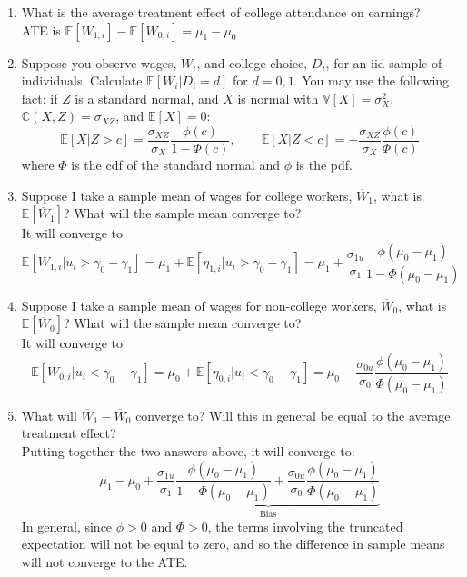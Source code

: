\documentclass[12pt]{article}
\newcommand\ov{\overline}
\newcommand\BB{\mathbb}
\newcommand\EE{\mathbb{E}}
\numberwithin{equation}{section}
\numberwithin{figure}{section}
\numberwithin{table}{section}
\begin{document}
\begin{enumerate}
\item What is the average treatment effect of college attendance on earnings? \\
  {\color{blue}ATE is $\EE[W_{1,i}]-\EE[W_{0,i}] = \mu_1-\mu_0$}
\item Suppose you observe wages, $W_i$, and college choice, $D_i$, for an iid sample of individuals. Calculate $\EE[W_i|D_i=d]$ for $d=0,1$. You may use the following fact: if $Z$ is a standard normal, and $X$ is normal with $\BB{V}[X]=\sigma^2_{X}$, $\BB{C}(X,Z)=\sigma_{XZ}$, and $\EE[X]=0$:
  \[\EE[X|Z>c] = \frac{\sigma_{XZ}}{\sigma_X}\frac{\phi(c)}{1-\Phi(c)},\qquad \EE[X|Z<c] = -\frac{\sigma_{XZ}}{\sigma_X}\frac{\phi(c)}{\Phi(c)} \]
  where $\Phi$ is the cdf of the standard normal and $\phi$ is the pdf.
\item Suppose I take a sample mean of wages for college workers, $\ov{W}_1$, what is $\EE[\ov{W}_1]$? What will the sample mean converge to? \\
  {\color{blue}  It will converge to
    \[\EE[W_{1,i}|u_i>\gamma_0-\gamma_1] = \mu_{1} + \EE[\eta_{1,i}|u_i>\gamma_0-\gamma_1] = \mu_1 + \frac{\sigma_{1u}}{\sigma_1}\frac{\phi(\mu_0-\mu_1)}{1-\Phi(\mu_0-\mu_1)}\]
  }
\item Suppose I take a sample mean of wages for non-college workers, $\ov{W}_0$, what is $\EE[\ov{W}_0]$? What will the sample mean converge to? \\
  {\color{blue}  It will converge to
    \[\EE[W_{0,i}|u_i<\gamma_0-\gamma_1] = \mu_{0} + \EE[\eta_{0,i}|u_i<\gamma_0-\gamma_1] = \mu_0 - \frac{\sigma_{0u}}{\sigma_0}\frac{\phi(\mu_0-\mu_1)}{\Phi(\mu_0-\mu_1)}\]
  }

\item What will $\ov{W}_1-\ov{W}_0$ converge to? Will this in general be equal to the average treatment effect? \\
  {\color{blue}  Putting together the two answers above, it will converge to:
    \[ \mu_1 - \mu_{0} + \underbrace{\frac{\sigma_{1u}}{\sigma_1}\frac{\phi(\mu_0-\mu_1)}{1-\Phi(\mu_0-\mu_1)}  + \frac{\sigma_{0u}}{\sigma_0}\frac{\phi(\mu_0-\mu_1)}{\Phi(\mu_0-\mu_1)}}_{\text{Bias}}\]
    In general, since $\phi>0$ and $\Phi>0$, the terms involving the truncated expectation will not be equal to zero, and so the difference in sample means will not converge to the ATE.
  }


\end{enumerate}
\end{document}
